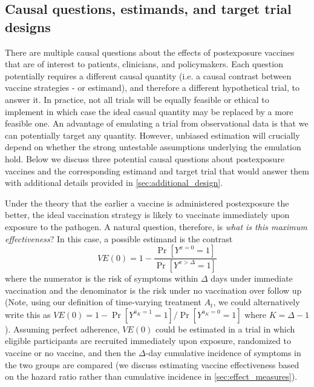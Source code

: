 \documentclass[11pt]{article}
\begin{document}
\subsection{Causal questions, estimands, and target trial designs}
There are multiple causal questions about the effects of postexposure vaccines that are of interest to patients, clinicians, and policymakers. Each question potentially requires a different causal quantity (i.e. a causal contrast between vaccine strategies - or estimand), and therefore a different hypothetical trial, to answer it. In practice, not all trials will be equally feasible or ethical to implement in which case the ideal  casual quantity may be replaced by a more feasible one. An advantage of emulating a trial from observational data is that we can potentially target any quantity. However, unbiased estimation will crucially depend on whether the strong untestable assumptions underlying the emulation hold. Below we discuss three potential causal questions about postexposure vaccines and the corresponding estimand and target trial that would answer them with additional details provided in \ref{sec:additional_design}. 

Under the theory that the earlier a vaccine is administered postexposure the better, the ideal vaccination strategy is likely to vaccinate immediately upon exposure to the pathogen. A natural question, therefore, is \textit{what is this maximum effectiveness}? In this case, a possible estimand is the contrast
\begin{equation}
  VE(0) = 1 - \frac{\Pr[Y^{x = 0} = 1]}{\Pr[Y^{x > \Delta} = 1]}
\end{equation}
where the numerator is the risk of symptoms within $\Delta$ days under immediate vaccination and the denominator is the risk under no vaccination over follow up (Note, using our definition of time-varying treatment $A_t$, we could alternatively write this as $VE(0) = 1 - \Pr[Y^{\overline{a}_{K} = 1} = 1]/\Pr[Y^{\overline{a}_{K} = 0} = 1]$ where $K = \Delta - 1$). Assuming perfect adherence, $VE(0)$ could be estimated in a trial in which eligible participants are recruited immediately upon exposure, randomized to vaccine or no vaccine, and then the $\Delta$-day cumulative incidence of symptoms in the two groups are compared (we discuss estimating vaccine effectiveness based on the hazard ratio rather than cumulative incidence in \ref{sec:effect_measures}). 
\end{document}
